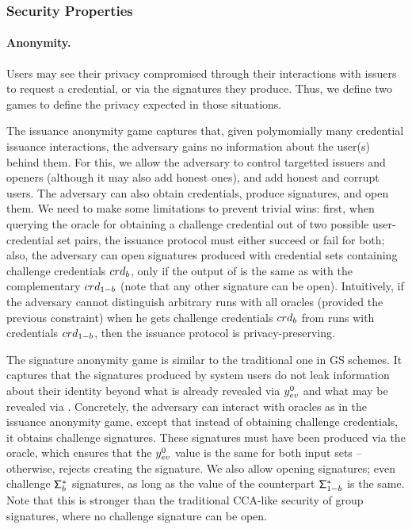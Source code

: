 \subsubsection{Security Properties}
\label{sssec:security}

\paragraph{Anonymity.} %
Users may see their privacy compromised through their interactions with issuers
to request a credential, or via the signatures they produce. Thus, we define two
games to define the privacy expected in those situations.

The issuance anonymity game captures that, given polymomially many
credential issuance interactions, the adversary gains no information about the
user(s) behind them. For this, we allow the adversary to control targetted
issuers and openers (although it may also add honest ones), and add honest and
corrupt users. The adversary can also obtain credentials, produce signatures,
and open them. We need to make some limitations to prevent trivial wins: first,
when querying the oracle for obtaining a challenge credential out of two
possible user-credential set pairs, the issuance protocol must either succeed or
fail for both; also, the adversary can open signatures produced with credential
sets containing challenge credentials $crd_b$, only if the output of \Open is
the same as with the complementary $crd_{1-b}$ (note that any other signature
can be open).
Intuitively, if the adversary cannot distinguish arbitrary runs with all oracles
(provided the previous constraint) when he gets challenge credentials $crd_b$
from runs with credentials $crd_{1-b}$, then the issuance protocol is
privacy-preserving.

The signature anonymity game is similar to the traditional one in GS schemes.
It captures that the signatures produced by system users do not leak information
about their identity beyond what is already revealed via $y_{ev}^0$ and what
may be revealed via \yinsp. Concretely, the adversary can interact with oracles
as in the issuance anonymity game, except that instead of obtaining challenge
credentials, it obtains challenge signatures. These signatures must have been
produced via the \CHALb oracle, which ensures that the $y_{ev}^0$ value is the
same for both input sets -- otherwise, rejects creating the signature. We also
allow opening signatures; even challenge $\mathsf{\Sigma}^*_b$ signatures, as long as the
\yinsp value of the counterpart $\mathsf{\Sigma}^*_{1-b}$ is the same. Note that this is
stronger than the traditional CCA-like security of group signatures, where no
challenge signature can be open.

